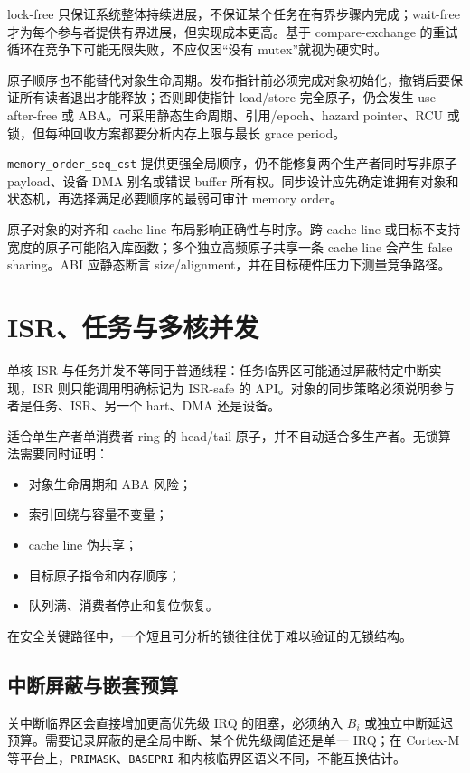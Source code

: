 lock-free 只保证系统整体持续进展，不保证某个任务在有界步骤内完成；wait-free 才为每个参与者提供有界进展，但实现成本更高。基于 compare-exchange 的重试循环在竞争下可能无限失败，不应仅因“没有 mutex”就视为硬实时。

原子顺序也不能替代对象生命周期。发布指针前必须完成对象初始化，撤销后要保证所有读者退出才能释放；否则即使指针 load/store 完全原子，仍会发生 use-after-free 或 ABA。可采用静态生命周期、引用/epoch、hazard pointer、RCU 或锁，但每种回收方案都要分析内存上限与最长 grace period。

\texttt{memory\_order\_seq\_cst} 提供更强全局顺序，仍不能修复两个生产者同时写非原子 payload、设备 DMA 别名或错误 buffer 所有权。同步设计应先确定谁拥有对象和状态机，再选择满足必要顺序的最弱可审计 memory order。

原子对象的对齐和 cache line 布局影响正确性与时序。跨 cache line 或目标不支持宽度的原子可能陷入库函数；多个独立高频原子共享一条 cache line 会产生 false sharing。ABI 应静态断言 size/alignment，并在目标硬件压力下测量竞争路径。

\section{ISR、任务与多核并发}

单核 ISR 与任务并发不等同于普通线程：任务临界区可能通过屏蔽特定中断实现，ISR 则只能调用明确标记为 ISR-safe 的 API。对象的同步策略必须说明参与者是任务、ISR、另一个 hart、DMA 还是设备。

适合单生产者单消费者 ring 的 head/tail 原子，并不自动适合多生产者。无锁算法需要同时证明：
\begin{itemize}
  \item 对象生命周期和 ABA 风险；
  \item 索引回绕与容量不变量；
  \item cache line 伪共享；
  \item 目标原子指令和内存顺序；
  \item 队列满、消费者停止和复位恢复。
\end{itemize}

在安全关键路径中，一个短且可分析的锁往往优于难以验证的无锁结构。

\subsection{中断屏蔽与嵌套预算}

关中断临界区会直接增加更高优先级 IRQ 的阻塞，必须纳入 $B_i$ 或独立中断延迟预算。需要记录屏蔽的是全局中断、某个优先级阈值还是单一 IRQ；在 Cortex-M 等平台上，\texttt{PRIMASK}、\texttt{BASEPRI} 和内核临界区语义不同，不能互换估计。

